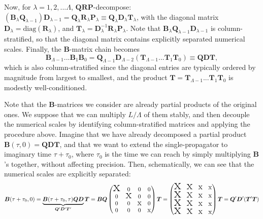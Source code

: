 Now, for $\lambda = 1, 2, ... \Lambda$, $\bm Q \bm R \bm P$-decompose: $(\bm B_\lambda \bm Q_{\lambda-1}) \bm D_{\lambda-1} = \bm Q_\lambda \bm R_\lambda \bm P_\lambda \equiv \bm Q_\lambda \bm D_\lambda \bm T_\lambda$, with the diagonal matrix $\bm D_\lambda = \text{diag} ( \bm R_\lambda ) $, and $\bm T_\lambda = \bm D_\lambda^{-1} \bm R_\lambda \bm P_\lambda$.
Note that $\bm B_\lambda \bm Q_{\lambda-1} \bm D_{\lambda-1}$ is column-stratified, so that the diagonal matrix contains explicitly separated numerical scales.
Finally, the $\bm B$-matrix chain becomes
\begin{equation}
\bm B_{\Lambda - 1} ... \bm B_1 \bm B_0 = \bm Q_{\Lambda - 1} \bm D_{\Lambda -2 } ( \bm T_{\Lambda-1} ... \bm T_1 \bm T_0 ) \equiv \bm Q \bm D \bm T ,
\end{equation}
which is also column-stratified since the diagonal entries are typically ordered by magnitude from largest to smallest, and the product $\bm T = \bm T_{\Lambda-1} ... \bm T_1 \bm T_0$ is modestly well-conditioned.

Note that the $\bm B$-matrices we consider are already partial products of the original ones.
We suppose that we can multiply $L / \Lambda $ of them stably, and then decouple the numerical scales by identifying column-stratified matrices and applying the procedure above.
Imagine that we have already decomposed a partial product $\bm B ( \tau, 0 ) = \bm Q \bm D \bm T$, and that we want to extend the single-propagator to imaginary time $\tau + \tau_0$, where $\tau_0$ is the time we can reach by simply multiplying $\bm B$'s together, without affecting precision.
Then, schematically, we can see that the numerical scales are explicitly separated:
\begin{equation}
\bm B ( \tau + \tau_0 , 0 ) = \underbrace{\bm B ( \tau + \tau_0, \tau ) \bm Q \bm D}_{\bm Q' \bm D' \bm T'} \bm T = 
\bm B \bm Q \begin{pmatrix}
$$ \mbox{\Huge x} $$ & 0 & 0 & 0 \\
0 & $$ \mbox{\huge x} $$ & 0 & 0 \\
0 & 0 & $$ \mbox{\Large x} $$ & 0 \\ 
0 & 0 & 0 & $$ \mbox{\large x} $$
\end{pmatrix} \bm T = 
\begin{pmatrix}
$$ \mbox{\Huge x} $$ & $$ \mbox{\huge x} $$ & $$ \mbox{\Large x} $$ & $$ \mbox{\large x} $$\\
$$ \mbox{\Huge x} $$ & $$ \mbox{\huge x} $$ & $$ \mbox{\Large x} $$ & $$ \mbox{\large x} $$ \\
$$ \mbox{\Huge x} $$ & $$ \mbox{\huge x} $$ & $$ \mbox{\Large x} $$ & $$ \mbox{\large x} $$ \\ 
$$ \mbox{\Huge x} $$ & $$ \mbox{\huge x} $$ & $$ \mbox{\Large x} $$ & $$ \mbox{\large x} $$
\end{pmatrix} \bm T
=  \bm Q' \bm D' ( \bm T'  \bm T )
\end{equation}

